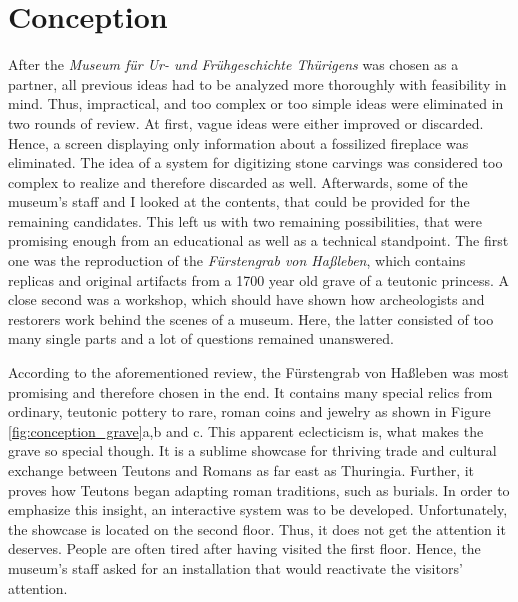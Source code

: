 \chapter{Conception}
\label{conception}

After the \textit{Museum für Ur- und Frühgeschichte Thürigens} was chosen as a partner, all previous ideas had to be analyzed more thoroughly with feasibility in mind. Thus, impractical, and too complex or too simple ideas were eliminated in two rounds of review. At first, vague ideas were either improved or discarded. Hence, a screen displaying only information about a fossilized fireplace was eliminated. The idea of a system for digitizing stone carvings was considered too complex to realize and therefore discarded as well. Afterwards, some of the museum's staff and I looked at the contents, that could be provided for the remaining candidates. This left us with two remaining possibilities, that were promising enough from an educational as well as a technical standpoint. The first one was the reproduction of the \textit{Fürstengrab von Haßleben}, which contains replicas and original artifacts from a 1700 year old grave of a teutonic princess. A close second was a workshop, which should have shown how archeologists and restorers work behind the scenes of a museum. Here, the latter consisted of too many single parts and a lot of questions remained unanswered.


According to the aforementioned review, the Fürstengrab von Haßleben was most promising and therefore chosen in the end. It contains many special relics from ordinary, teutonic pottery to rare, roman coins and jewelry as shown in Figure \ref{fig:conception_grave}a,b and c. This apparent eclecticism is, what makes the grave so special though. It is a sublime showcase for thriving trade and cultural exchange between Teutons and Romans as far east as Thuringia. Further, it proves how Teutons began adapting roman traditions, such as burials. In order to emphasize this insight, an interactive system was to be developed. Unfortunately, the showcase is located on the second floor. Thus, it does not get the attention it deserves. People are often tired after having visited the first floor. Hence, the museum's staff asked for an installation that would reactivate the visitors' attention.

